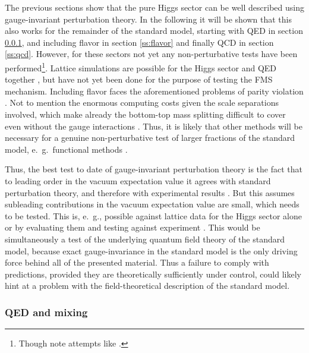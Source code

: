 \documentclass[final,twoside,12pt]{article}
\newcommand*{\1}{1\!\!\!\bot}
\begin{document}
The previous sections show that the pure Higgs sector can be well described using gauge-invariant perturbation theory. In the following it will be shown that this also works for the remainder of the standard model, starting with QED in section \ref{ss:qed}, and including flavor in section \ref{ss:flavor} and finally QCD in section \ref{ss:qcd}. However, for these sectors not yet any non-perturbative tests have been performed\footnote{Though note attempts like \cite{Aoki:1989xe}.}. Lattice simulations are possible for the Higgs sector and QED together \cite{Zubkov:2010np,Zubkov:2011sk,Zubkov:2011ia,Lucini:2015hfa,Shrock:1985un}, but have not yet been done for the purpose of testing the FMS mechanism. Including flavor faces the aforementioned problems of parity violation \cite{Hasenfratz:2007dp,Grabowska:2015qpk,Gattringer:2008je,Cundy:2010pu,Igarashi:2009kj}. Not to mention the enormous computing costs given the scale separations involved, which make already the bottom-top mass splitting difficult to cover even without the gauge interactions \cite{Gerhold:2007gx,Gerhold:2011mx}. Thus, it is likely that other methods will be necessary for a genuine non-perturbative test of larger fractions of the standard model, e.\ g.\ functional methods \cite{Maas:2011se,Alkofer:2000wg,Gies:2006wv,Kopietz:2010zz,Binosi:2009qm,Boucaud:2011ug,Roberts:2015lja}.

Thus, the best test to date of gauge-invariant perturbation theory is the fact that to leading order in the vacuum expectation value it agrees with standard perturbation theory, and therefore with experimental results \cite{pdg}. But this assumes subleading contributions in the vacuum expectation value are small, which needs to be tested. This is, e.\ g., possible against lattice data for the Higgs sector alone \cite{Raubitzek:unpublished,Maas:unpublished} or by evaluating them and testing against experiment \cite{Egger:2017tkd,Fernbach:unpublished}. This would be simultaneously a test of the underlying quantum field theory of the standard model, because exact gauge-invariance in the standard model is the only driving force behind all of the presented material. Thus a failure to comply with predictions, provided they are theoretically sufficiently under control, could likely hint at a problem with the field-theoretical description of the standard model.

\subsubsection{QED and mixing}\label{ss:qed}
\end{document}

